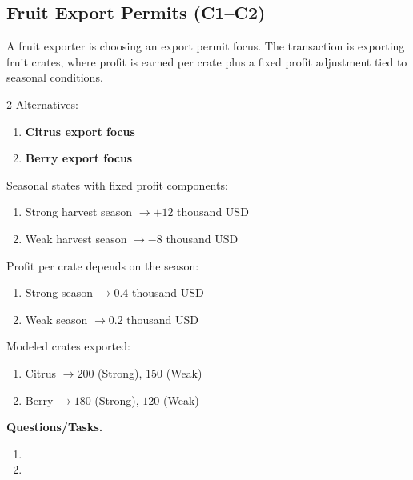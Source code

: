 	\subsection{Fruit Export Permits (C1--C2)}
	\label{sec:problem21-fruit-export-permits-c1-c2}
	A fruit exporter is choosing an export permit focus. The transaction is exporting fruit crates, where profit is earned per crate plus a fixed profit adjustment tied to seasonal conditions.
	
	\begin{multicols}{2}
		Alternatives:
		\begin{enumerate}[label=\arabic*.]
			\item \textbf{Citrus export focus}
			\item \textbf{Berry export focus}
		\end{enumerate}
	
		Seasonal states with fixed profit components:
		\begin{enumerate}[label=\arabic*.]
			\item Strong harvest season $\to +12$ thousand USD
			\item Weak harvest season $\to -8$ thousand USD
		\end{enumerate}
	
			\columnbreak
	
		Profit per crate depends on the season:
		\begin{enumerate}[label=\arabic*.]
			\item Strong season $\to 0.4$ thousand USD
			\item Weak season $\to 0.2$ thousand USD
		\end{enumerate}
	
		Modeled crates exported:
		\begin{enumerate}[label=\arabic*.]
			\item Citrus $\to 200$ (Strong), $150$ (Weak)
			\item Berry $\to 180$ (Strong), $120$ (Weak)
		\end{enumerate}
	\end{multicols}

	\textbf{Questions/Tasks.}
	\begin{enumerate}[label=\textbf{\alph*)}]
		\item {}
		\item {}
	\end{enumerate}
	
